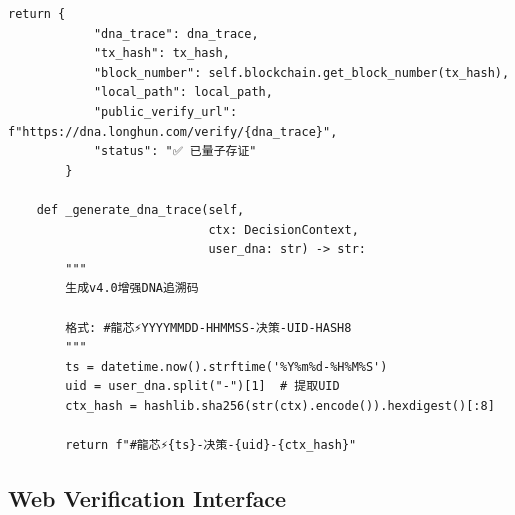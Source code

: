 \begin{lstlisting}[style=python,
  caption={区块链存证集成（v4.0新增）
    · DNA: \#龍芯⚡️2026-03-10-BLOCKCHAIN-v4.0},
  label={lst:blockchain}]
        return {
            "dna_trace": dna_trace,
            "tx_hash": tx_hash,
            "block_number": self.blockchain.get_block_number(tx_hash),
            "local_path": local_path,
            "public_verify_url": f"https://dna.longhun.com/verify/{dna_trace}",
            "status": "✅ 已量子存证"
        }
    
    def _generate_dna_trace(self,
                            ctx: DecisionContext,
                            user_dna: str) -> str:
        """
        生成v4.0增强DNA追溯码
        
        格式: #龍芯⚡️YYYYMMDD-HHMMSS-决策-UID-HASH8
        """
        ts = datetime.now().strftime('%Y%m%d-%H%M%S')
        uid = user_dna.split("-")[1]  # 提取UID
        ctx_hash = hashlib.sha256(str(ctx).encode()).hexdigest()[:8]
        
        return f"#龍芯⚡️{ts}-决策-{uid}-{ctx_hash}"
\end{lstlisting}

\subsection{Web Verification Interface}
\label{ssec:web-verify-v4}

